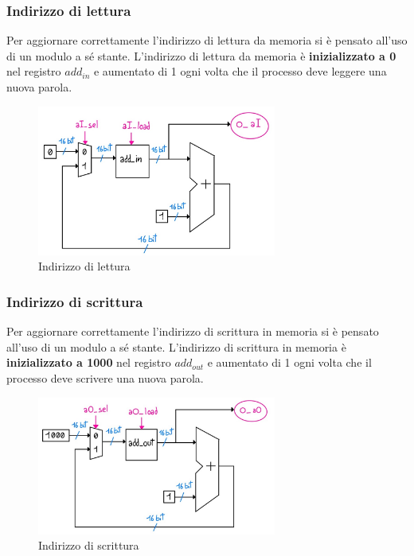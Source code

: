 \documentclass[12pt]{article} %
\begin{document}
			\subsubsection{Indirizzo di lettura}
				Per aggiornare correttamente l'indirizzo di lettura da memoria si è pensato all'uso di un modulo
				a sé stante. L'indirizzo di lettura da memoria  è \textbf{inizializzato a 0}  nel registro $add_{in}$ 
				e aumentato di 1 ogni volta che il processo deve leggere una nuova parola.
				\begin{figure}[h]
					\centering
					\includegraphics[width=0.7\textwidth]{Data_path_indirizzoLettura.jpg}
					\caption{Indirizzo di lettura}
					\label{fig:Data_path_indirizzoLettura}
				\end{figure}
			\subsubsection{Indirizzo di scrittura}
				Per aggiornare correttamente l'indirizzo di scrittura in memoria si è pensato all'uso di un modulo
				a sé stante. L'indirizzo di scrittura in memoria è \textbf{inizializzato a 1000}  nel registro $add_{out}$ 
				e aumentato di 1 ogni volta che il processo deve scrivere una nuova parola.
				\begin{figure}[h]
					\centering
					\includegraphics[width=0.7\textwidth]{Data_path_indirizzoScrittura.jpg}
					\caption{Indirizzo di scrittura}
					\label{fig:Data_path_indirizzoScrittura}
				\end{figure}
\end{document}
